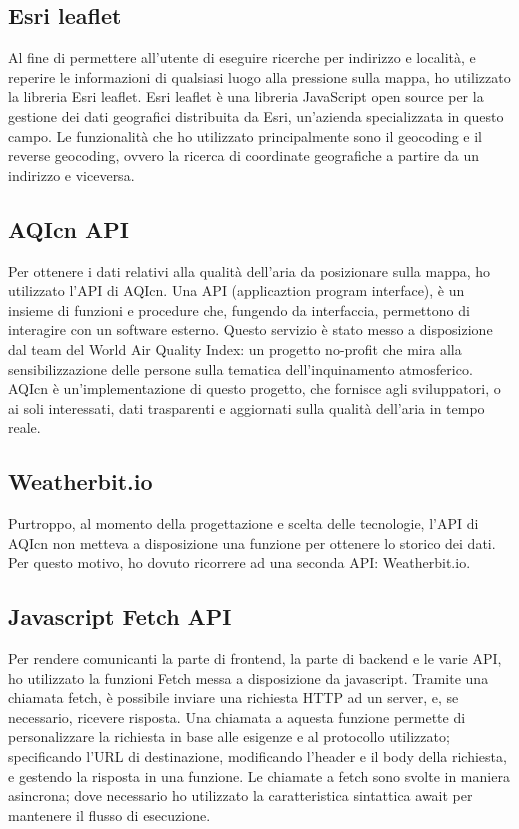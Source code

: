 \subsection{Esri leaflet}
Al fine di permettere all'utente di eseguire ricerche per indirizzo e località, e reperire le informazioni di qualsiasi luogo alla pressione sulla mappa, ho utilizzato la libreria Esri leaflet.
Esri leaflet è una libreria JavaScript open source per la gestione dei dati geografici distribuita da Esri, un'azienda specializzata in questo campo.
Le funzionalità che ho utilizzato principalmente sono il geocoding e il reverse geocoding, ovvero la ricerca di coordinate geografiche a partire da un indirizzo e viceversa.

\subsection{AQIcn API}
Per ottenere i dati relativi alla qualità dell'aria da posizionare sulla mappa, ho utilizzato l'API di AQIcn.
Una API (applicaztion program interface), è un insieme di funzioni e procedure che, fungendo da interfaccia, permettono di interagire con un software esterno.
Questo servizio è stato messo a disposizione dal team del World Air Quality Index: un progetto no-profit che mira alla sensibilizzazione delle persone sulla tematica dell'inquinamento atmosferico.
AQIcn è un'implementazione di questo progetto, che fornisce agli sviluppatori, o ai soli interessati, dati trasparenti e aggiornati sulla qualità dell'aria in tempo reale.

\subsection{Weatherbit.io}
Purtroppo, al momento della progettazione e scelta delle tecnologie, l'API di AQIcn non metteva a disposizione una funzione per ottenere lo storico dei dati.
Per questo motivo, ho dovuto ricorrere ad una seconda API: Weatherbit.io.

\subsection{Javascript Fetch API}
Per rendere comunicanti la parte di frontend, la parte di backend e le varie API, ho utilizzato la funzioni Fetch messa a disposizione da javascript.
Tramite una chiamata fetch, è possibile inviare una richiesta HTTP ad un server, e, se necessario, ricevere risposta.
Una chiamata a aquesta funzione permette di personalizzare la richiesta in base alle esigenze e al protocollo utilizzato; specificando l'URL di destinazione, modificando l'header e il body della richiesta, e gestendo la risposta in una funzione.
Le chiamate a fetch sono svolte in maniera asincrona; dove necessario ho utilizzato la caratteristica sintattica await per mantenere il flusso di esecuzione.

